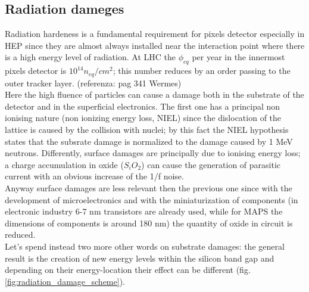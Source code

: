 \subsection{Radiation dameges}
Radiation hardeness is a fundamental requirement for pixels detector especially in HEP since they are almost always installed near the interaction point where there is a high energy level of radiation. At LHC the $\phi_{eq}$ per year in the innermost pixels detector is $10^{14} n_{eq}/cm^2$; this number reduces by an order passing to the outer tracker layer. (referenza: pag 341 Wermes)\\ 
Here the high fluence of particles can cause a damage both in the substrate of the detector and in the superficial electronics. The first one has a principal non ionising nature (non ionizing energy loss, NIEL) since the dislocation of the lattice is caused by the collision with nuclei; by this fact the NIEL hypothesis states that the subsrate damage is normalized to the damage caused by 1 MeV neutrons. Differently, surface damages are principally due to ionising energy loss; a charge accumulation in oxide ($S_iO_2$) can cause the generation of parasitic current with an obvious increase of the 1/f noise.\\
Anyway surface damages are less relevant then the previous one since with the development of microelectronics and with the miniaturization of components (in electronic industry 6-7 nm transistors are already used, while for MAPS the dimensions of components is around 180 nm) the quantity of oxide in circuit is reduced.\\
Let's spend instead two more other words on substrate damages: the general result is the creation of new energy levels within the silicon band gap and depending on their energy-location their effect can be different (fig. \ref{fig:radiation_damage_scheme}). 
